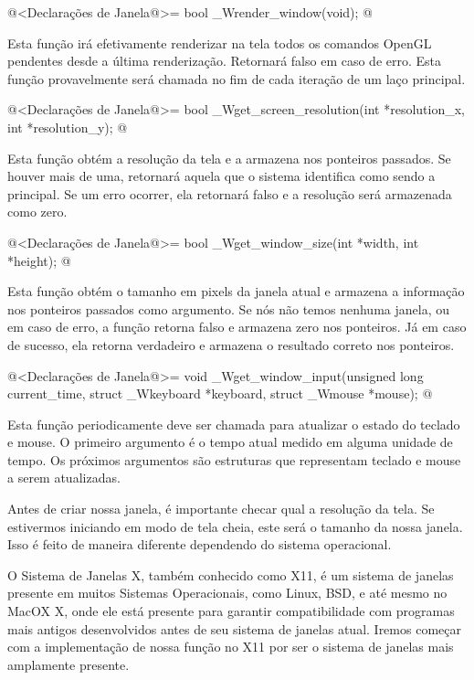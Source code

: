 \iniciocodigo
@<Declarações de Janela@>=
bool _Wrender_window(void);
@
\fimcodigo

Esta função irá efetivamente renderizar na tela todos os comandos
OpenGL pendentes desde a última renderização. Retornará falso em caso
de erro. Esta função provavelmente será chamada no fim de cada
iteração de um laço principal.

\iniciocodigo
@<Declarações de Janela@>=
bool _Wget_screen_resolution(int *resolution_x, int *resolution_y);
@
\fimcodigo

Esta função obtém a resolução da tela e a armazena nos ponteiros
passados. Se houver mais de uma, retornará aquela que o sistema
identifica como sendo a principal. Se um erro ocorrer, ela retornará
falso e a resolução será armazenada como zero.

\iniciocodigo
@<Declarações de Janela@>=
bool _Wget_window_size(int *width, int *height);
@
\fimcodigo

Esta função obtém o tamanho em pixels da janela atual e armazena a
informação nos ponteiros passados como argumento. Se nós não temos
nenhuma janela, ou em caso de erro, a função retorna falso e armazena
zero nos ponteiros. Já em caso de sucesso, ela retorna verdadeiro e
armazena o resultado correto nos ponteiros.

\iniciocodigo
@<Declarações de Janela@>=
void _Wget_window_input(unsigned long current_time, struct _Wkeyboard *keyboard,
                        struct _Wmouse *mouse);
@
\fimcodigo

Esta função periodicamente deve ser chamada para atualizar o estado do
teclado e mouse. O primeiro argumento é o tempo atual medido em alguma
unidade de tempo. Os próximos argumentos são estruturas que
representam teclado e mouse a serem atualizadas.



Antes de criar nossa janela, é importante checar qual a resolução da
tela. Se estivermos iniciando em modo de tela cheia, este será o
tamanho da nossa janela. Isso é feito de maneira diferente dependendo
do sistema operacional.


O Sistema de Janelas X, também conhecido como X11, é um sistema de
janelas presente em muitos Sistemas Operacionais, como Linux, BSD, e
até mesmo no MacOX X, onde ele está presente para garantir
compatibilidade com programas mais antigos desenvolvidos antes de seu
sistema de janelas atual. Iremos começar com a implementação de nossa
função no X11 por ser o sistema de janelas mais amplamente presente.

